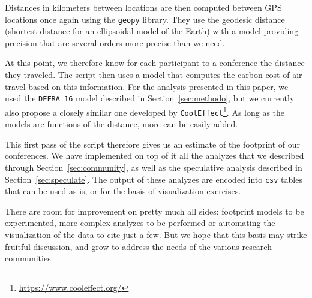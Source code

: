 Distances in kilometers between locations are then computed between GPS locations
once again using the \texttt{geopy} library. They use the geodesic distance
(shortest distance for an ellipsoidal model of the Earth) with a model providing
precision that are several orders more precise than we need.

At this point, we therefore know for each participant to a conference the
distance they traveled. The script then uses a model that computes the carbon
cost of air travel based on this information. For the analysis presented in this
paper, we used the \texttt{DEFRA 16} model described in
Section~\ref{sec:methodo}, but we currently also propose a closely similar one
developed by \texttt{CoolEffect}\footnote{\url{https://www.cooleffect.org/}}.
As long as the models are functions of the distance, more can be easily added.

This first pass of the script therefore gives us an estimate of the footprint of
our conferences. We have implemented on top of it all the analyzes that we
described through Section~\ref{sec:community}, as well as the speculative
analysis described in Section~\ref{sec:speculate}. The output of these analyzes
are encoded into \texttt{csv} tables that can be used as is, or for the basis of
visualization exercises.

There are room for improvement on pretty much all sides: footprint models to be
experimented, more complex analyzes to be performed or automating the visualization
of the data to cite just a few. But we hope that this basis may strike fruitful
discussion, and grow to address the needs of the various research communities.

